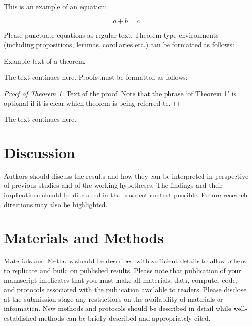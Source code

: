 \documentclass[journal,article,submit,moreauthors,pdftex,water]{Definitions/mdpi}
\begin{document}
This is an example of an equation:

\begin{equation}
a + b = c
\end{equation}

Please punctuate equations as regular text. Theorem-type environments (including propositions, lemmas, corollaries etc.) can be formatted as follows:
\begin{Theorem}
Example text of a theorem.
\end{Theorem}

The text continues here. Proofs must be formatted as follows:

\begin{proof}[Proof of Theorem 1]
Text of the proof. Note that the phrase `of Theorem 1' is optional if it is clear which theorem is being referred to.
\end{proof}
The text continues here.

\section{Discussion}

Authors should discuss the results and how they can be interpreted in perspective of previous studies and of the working hypotheses. The findings and their implications should be discussed in the broadest context possible. Future research directions may also be highlighted.

\section{Materials and Methods}

Materials and Methods should be described with sufficient details to allow others to replicate and build on published results. Please note that publication of your manuscript implicates that you must make all materials, data, computer code, and protocols associated with the publication available to readers. Please disclose at the submission stage any restrictions on the availability of materials or information. New methods and protocols should be described in detail while well-established methods can be briefly described and appropriately cited.
\end{document}
